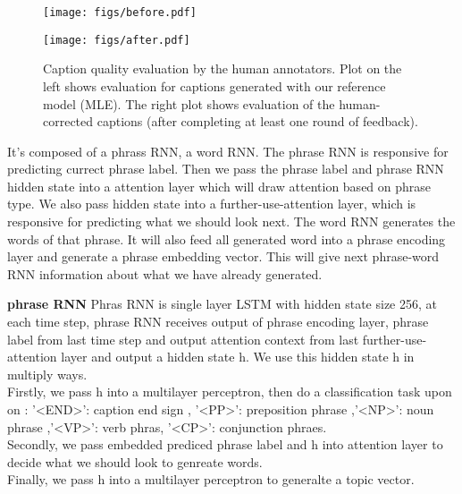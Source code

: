 \begin{figure}[t!]
\vspace{-3mm}
\centering
\begin{minipage}{0.3\linewidth}
  \texttt{[image: figs/before.pdf]}
  \end{minipage}
    \hspace{1mm}
  \begin{minipage}{0.30\linewidth}
  \texttt{[image: figs/after.pdf]}
  \end{minipage}
  \hspace{2mm}
 \begin{minipage}{0.33\linewidth}
 \vspace{-2mm}
  \caption{\small Caption quality evaluation by the human annotators. Plot on the left shows evaluation for captions generated with our reference model (MLE). The right plot
  shows evaluation of the human-corrected captions (after completing at least one round of feedback).}
  \label{fig:eval}
  \end{minipage}
  \vspace{-2mm}
\end{figure}

\iffalse
It's composed of a phrass RNN, a word RNN. The phrase RNN is responsive for predicting currect phrase label. Then we pass the phrase label and phrase RNN hidden state into a attention layer which will draw attention based on phrase type. We also pass hidden state into a further-use-attention layer, which is responsive for predicting what we should look next. The word RNN generates the words of that phrase. It will also feed all generated word into a phrase encoding layer and generate a phrase embedding vector. This will give next phrase-word RNN information about what we have already generated.


\textbf{phrase RNN } Phras RNN is single layer LSTM with hidden state size 256, at each time step, phrase RNN receives output of phrase encoding layer, phrase label from last time step and output attention context from last further-use-attention layer and output a hidden state h. We use this hidden state h in multiply ways. \\
Firstly, we pass h into a multilayer perceptron, then do a classification task upon on : '<END>': caption end sign , '<PP>': preposition phrase ,'<NP>': noun phrase ,'<VP>': verb phras, '<CP>': conjunction phraes.\\
Secondly, we pass embedded prediced phrase label and h into attention layer to decide what we should look to genreate words.\\
Finally, we pass h into a multilayer perceptron to generalte a topic vector.\\\\

